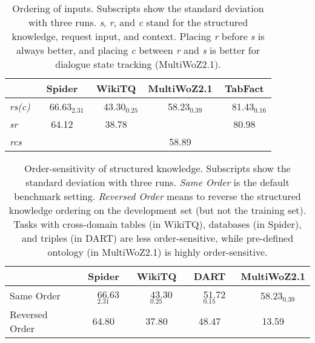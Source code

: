 \begin{table}[t]
	\centering
	\small
	\begin{adjustbox}{width=0.95\linewidth}
		\begin{tabular}{@{}lcccc@{}}
		    \toprule
		    & Spider & WikiTQ & MultiWoZ2.1 & TabFact\\
			\midrule
			 \textit{rs(c)} & \quad \ \ 66.63$_{2.31}$ & \quad \ \ 43.30$_{0.25}$ & \quad \ \ 58.23$_{0.39}$ & \quad \ \ 81.43$_{0.16}$ \\
			 \textit{sr} & 64.12 & 38.78 & \na & 80.98 \\ \textit{rcs} & \na & \na & 58.89 & \na \\
			\bottomrule
		\end{tabular}
	\end{adjustbox}
	\caption{Ordering of inputs. Subscripts show the standard deviation with three runs. \textit{s}, \textit{r}, and \textit{c} stand for the structured knowledge, request input, and context. Placing \textit{r} before \textit{s} is always better, and placing \textit{c} between \textit{r} and \textit{s} is better for dialogue state tracking (MultiWoZ2.1).
	}
	\label{tab:sk_txt_ordering}
\end{table}

\begin{table}[t]
    \small
	\centering
	\begin{adjustbox}{width=1\linewidth}
		\begin{tabular}{@{}l@{}cccc@{}}
		    \toprule
			& Spider & WikiTQ & DART & MultiWoZ2.1 \\
			\midrule
			Same Order & \quad \ \ 66.63$_{2.31}$ & \quad \ \ 43.30$_{0.25}$ & \quad \ \ 51.72$_{0.15}$ & \quad \ \ 58.23$_{0.39}$ \\
			Reversed Order & 64.80 & 37.80 & 48.47 & 13.59 \\
			\bottomrule
		\end{tabular}
	\end{adjustbox}
	\caption{Order-sensitivity of structured knowledge. Subscripts show the standard deviation with three runs. \textit{Same Order} is the default benchmark setting. \textit{Reversed Order} means to reverse the structured knowledge ordering on the development set (but not the training set). 
	Tasks with cross-domain tables (in WikiTQ), databases (in Spider), and triples (in DART) are less order-sensitive, while pre-defined ontology (in MultiWoZ2.1) is highly order-sensitive. }
	\label{tab:sk_ordering}
\end{table}

